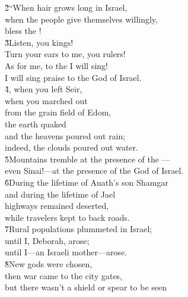 \begin{poetry}
\poeml \v{2}``When hair grows long in Israel, \\
\poemll    when the people give themselves willingly, \\
\poemlll       bless the ! \\
\poeml \v{3}Listen, you kings! \\
\poemll    Turn your ears to me, you rulers! \\
\poeml As for me, to the  I will sing! \\
\poemll    I will sing praise to the  God of Israel. \\
\poeml \v{4}, when you left Seir, \\
\poemll    when you marched out \\
\poemlll       from the grain field of Edom, \\
\poeml the earth quaked \\
\poemll    and the heavens poured out rain; \\
\poemlll       indeed, the clouds poured out water. \\
\poeml \v{5}Mountains tremble at the presence of the  --- \\
\poemll    even Sinai!---at the presence of the  God of Israel. \\
\poeml \v{6}During the lifetime of Anath's son Shamgar \\
\poemll    and during the lifetime of Jael \\
\poeml highways remained deserted, \\
\poemll    while travelers kept to back roads. \\
\poeml \v{7}Rural populations plummeted in Israel; \\
\poemll    until I, Deborah, arose; \\
\poemlll       until I---an Israeli mother---arose. \\
\poeml \v{8}New gods were chosen, \\
\poemll    then war came to the city gates, \\
\poeml but there wasn't a shield or spear to be seen \\

\end{poetry}
